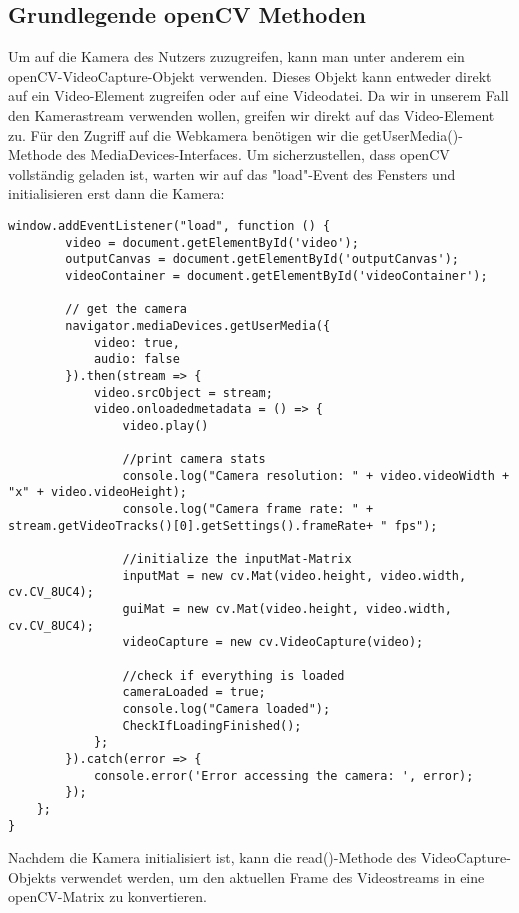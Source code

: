 \subsection{Grundlegende openCV Methoden}
Um auf die Kamera des Nutzers zuzugreifen, kann man unter anderem ein openCV-VideoCapture-Objekt verwenden. Dieses Objekt kann entweder direkt auf ein Video-Element zugreifen oder auf eine Videodatei. Da wir in unserem Fall den Kamerastream verwenden wollen, greifen wir direkt auf das Video-Element zu. Für den Zugriff auf die Webkamera benötigen wir die getUserMedia()-Methode des MediaDevices-Interfaces. Um sicherzustellen, dass openCV vollständig geladen ist, warten wir auf das "load"-Event des Fensters und initialisieren erst dann die Kamera:

\begin{lstlisting}[style=JavaScript]
    window.addEventListener("load", function () {
        video = document.getElementById('video');
        outputCanvas = document.getElementById('outputCanvas');
        videoContainer = document.getElementById('videoContainer');

        // get the camera
        navigator.mediaDevices.getUserMedia({
            video: true,
            audio: false
        }).then(stream => {
            video.srcObject = stream;
            video.onloadedmetadata = () => {
                video.play()

                //print camera stats
                console.log("Camera resolution: " + video.videoWidth + "x" + video.videoHeight);
                console.log("Camera frame rate: " + stream.getVideoTracks()[0].getSettings().frameRate+ " fps");

                //initialize the inputMat-Matrix
                inputMat = new cv.Mat(video.height, video.width, cv.CV_8UC4);
                guiMat = new cv.Mat(video.height, video.width, cv.CV_8UC4);
                videoCapture = new cv.VideoCapture(video);

                //check if everything is loaded
                cameraLoaded = true;
                console.log("Camera loaded");
                CheckIfLoadingFinished();
            };
        }).catch(error => {
            console.error('Error accessing the camera: ', error);
        });
    };
}
\end{lstlisting}

Nachdem die Kamera initialisiert ist, kann die read()-Methode des VideoCapture-Objekts verwendet werden, um den aktuellen Frame des Videostreams in eine openCV-Matrix zu konvertieren. 


